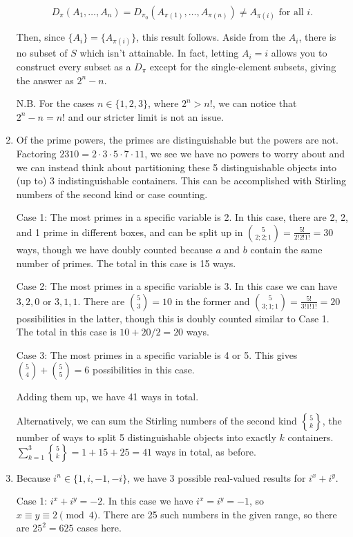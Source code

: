 \documentclass{book}
\numberwithin{equation}{section}
\begin{document}
\begin{enumerate}[label={9.\arabic*}]
$$D_{\pi}(A_1, \ldots, A_n) = D_{\pi_0}(A_{\pi(1)}, \ldots, A_{\pi(n)}) \neq A_{\pi(i)} \text{ for all }i.$$

Then, since $\{A_i\} = \{A_{\pi(i)}\}$, this result follows. Aside from the $A_i$, there is no subset of $S$ which isn't
attainable. In fact, letting $A_i = i$ allows you to construct every subset as a $D_{\pi}$ except for the single-element
subsets, giving the answer as $2^n - n$.

N.B. For the cases $n \in \{1, 2, 3\}$, where $2^n > n!$, we can notice that \\
$2^n - n = n!$ and our stricter limit is not an issue.

\item
Of the prime powers, the primes are distinguishable but the powers are not. Factoring $2310 = 2\cdot3\cdot5\cdot7\cdot11$,
we see we have no powers to worry about and we can instead think about partitioning these 5 distinguishable objects
into (up to) 3 indistinguishable containers. This can be accomplished with Stirling numbers of the second kind or case counting.

Case 1: The most primes in a specific variable is 2. In this case, there are 2, 2, and 1 prime in different boxes, and can be
split up in ${5 \choose 2;2;1} = \frac{5!}{2!2!1!} = 30$ ways, though we have doubly counted because $a$ and $b$ contain
the same number of primes. The total in this case is 15 ways.

Case 2: The most primes in a specific variable is 3. In this case we can have $3, 2, 0$ or $3, 1, 1$. There are ${5 \choose 3} = 10$ in the former and ${5 \choose 3;1;1} = \frac{5!}{3!1!1!} = 20$ possibilities in the latter, though this is doubly counted similar
to Case 1. The total in this case is $10 + 20/2 = 20$ ways.

Case 3: The most primes in a specific variable is 4 or 5. This gives ${5 \choose 4} + {5 \choose 5} = 6$ possibilities in this case.

Adding them up, we have 41 ways in total.

Alternatively, we can sum the Stirling numbers of the second kind ${5 \brace k}$, the number of ways to split 5
distinguishable objects into exactly $k$ containers. $\sum_{k=1}^3 {5 \brace k} = 1 + 15 + 25 = 41$ ways in total, as before.

\item
Because $i^n \in \{1, i, -1, -i\}$, we have 3 possible real-valued results for $i^x + i^y$.

Case 1: $i^x + i^y = -2$. In this case we have $i^x = i^y = -1$, so $x \equiv y \equiv 2 \pmod{4}$. There are 25 such numbers
in the given range, so there are $25^2 = 625$ cases here.


\end{enumerate}
\end{document}
